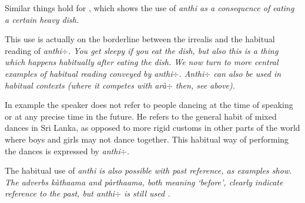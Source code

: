Similar things hold for , which shows the use of \em anthi \em as a consequence of eating a certain heavy dish.





This use is actually on the borderline between the irrealis and the habitual reading of \em anthi$\div$\em. You get sleepy \em if \em you eat the dish, but also this is a thing which happens \em  habitually \em after eating the dish. We now turn to more central examples of habitual reading conveyed by \em anthi$\div$\em.
\em Anthi$\div$ \em  can also be used in habitual contexts (where it competes with  \em arà$\div$ \em  then, see above).


% 
%  

In example  the speaker does not refer to people dancing at the time of speaking or at any precise time in the future. He refers to the general habit of mixed dances in Sri Lanka, as opposed to more rigid customs in other parts of the world where boys and girls may not dance together. This habitual way of performing the dances is expressed by  \em anthi$\div$\em.


The habitual use of \em anthi \em is also possible with past reference, as examples  show. The adverbs \em kàthaama \em and \em pàrthaama\em, both meaning `before', clearly indicate reference to the past, but \em anthi$\div$ \em is still used \citep[cf.][]{Givon1994sil}.

